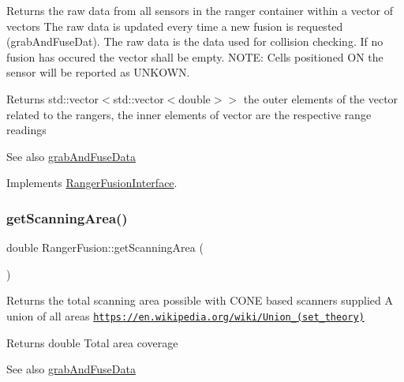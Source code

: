 Returns the raw data from all sensors in the ranger container within a vector of vectors The raw data is updated every time a new fusion is requested (grab\+And\+Fuse\+Dat). The raw data is the data used for collision checking. If no fusion has occured the vector shall be empty. N\+O\+TE\+: Cells positioned ON the sensor will be reported as U\+N\+K\+O\+WN. 

\begin{DoxyReturn}{Returns}
std\+::vector$<$std\+::vector$<$double$>$$>$ the outer elements of the vector related to the rangers, the inner elements of vector are the respective range readings
\end{DoxyReturn}
\begin{DoxySeeAlso}{See also}
\hyperlink{classRangerFusion_aa9265f72bc3572567c9cf98cf6d9f0e1}{grab\+And\+Fuse\+Data} 
\end{DoxySeeAlso}


Implements \hyperlink{classRangerFusionInterface_a9d60ca5866261026b870d7c0171587f5}{Ranger\+Fusion\+Interface}.

\mbox{\label{classRangerFusion_a7215e5405e808b5a853984e2b70ed6ad}} 
\subsubsection{\texorpdfstring{get\+Scanning\+Area()}{getScanningArea()}}
{\footnotesize\ttfamily double Ranger\+Fusion\+::get\+Scanning\+Area (\begin{DoxyParamCaption}{ }\end{DoxyParamCaption})\hspace{0.3cm}{\ttfamily [virtual]}}



Returns the total scanning area possible with C\+O\+NE based scanners supplied A union of all areas \href{https://en.wikipedia.org/wiki/Union_(set_theory)}{\tt https\+://en.\+wikipedia.\+org/wiki/\+Union\+\_\+(set\+\_\+theory)} 

\begin{DoxyReturn}{Returns}
double Total area coverage
\end{DoxyReturn}
\begin{DoxySeeAlso}{See also}
\hyperlink{classRangerFusion_aa9265f72bc3572567c9cf98cf6d9f0e1}{grab\+And\+Fuse\+Data} 
\end{DoxySeeAlso}


